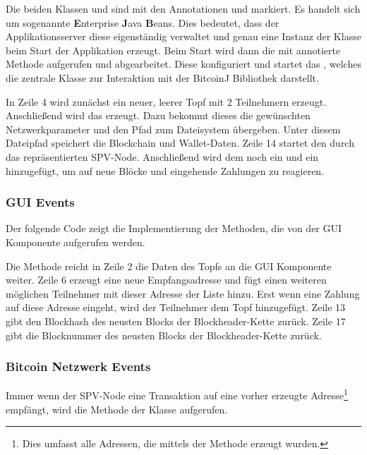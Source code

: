 
\noindent Die beiden Klassen  und  sind mit den Annotationen  und  markiert. Es handelt sich um sogenannte \textbf{E}nterprise \textbf{J}ava \textbf{B}eans. Dies bedeutet, dass der Applikationsserver diese eigenständig verwaltet und genau eine Instanz der Klasse beim Start der Applikation erzeugt. Beim Start wird dann die mit  annotierte  Methode aufgerufen und abgearbeitet. Diese konfiguriert und startet das , welches die zentrale Klasse zur Interaktion mit der BitcoinJ Bibliothek darstellt.

 In Zeile 4 wird zunächst ein neuer, leerer Topf mit 2 Teilnehmern erzeugt. Anschließend wird das  erzeugt. Dazu bekommt dieses die gewünschten Netzwerkparameter und den Pfad zum Dateisystem übergeben. Unter diesem Dateipfad speichert  die Blockchain und Wallet-Daten. Zeile 14 startet den durch das  repräsentierten SPV-Node. Anschließend wird dem  noch ein  und ein  hinzugefügt, um auf neue Blöcke und eingehende Zahlungen zu reagieren.

\subsubsection{GUI Events}

Der folgende Code zeigt die Implementierung der Methoden, die von der GUI Komponente aufgerufen werden.

Die Methode  reicht in Zeile 2 die Daten des Topfs an die GUI Komponente weiter. Zeile 6 erzeugt eine neue Empfangsadresse und fügt einen weiteren möglichen Teilnehmer mit dieser Adresse der  Liste hinzu. Erst wenn eine Zahlung auf diese Adresse eingeht, wird der Teilnehmer dem Topf hinzugefügt. Zeile 13 gibt den Blockhash des neusten Blocks der Blockheader-Kette zurück. Zeile 17 gibt die Blocknummer des neusten Blocks der  Blockheader-Kette zurück.

\subsubsection{Bitcoin Netzwerk Events}

Immer wenn der SPV-Node eine Transaktion auf eine vorher erzeugte Adresse\footnote{Dies umfasst alle Adressen, die mittels der  Methode erzeugt wurden.} empfängt, wird die  Methode der Klasse  aufgerufen.

